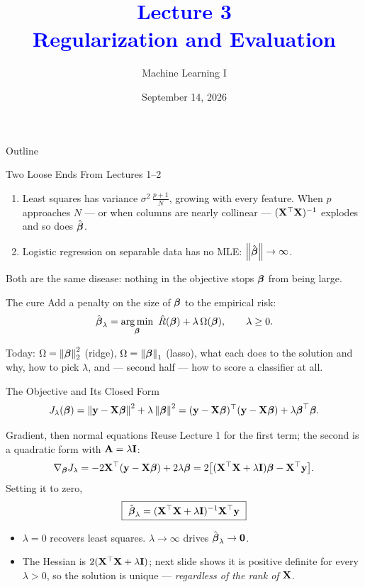\documentclass[11pt,aspectratio=169]{beamer}
\title{\textcolor{blue}{Lecture 3 \\ Regularization and Evaluation}}
\subtitle{Machine Learning I}
\date{September 14, 2026}
\begin{document}
\begin{frame}[plain]
\maketitle
\end{frame}

\begin{frame}{Outline}
\tableofcontents
\end{frame}

\begin{frame}{Two Loose Ends From Lectures 1--2}
\begin{enumerate}
  \item Least squares has variance $\sigma^2\,\tfrac{p+1}{N}$, growing with every feature. When $p$ approaches
        $N$ --- or when columns are nearly collinear --- $(\mathbf{X}^{\top}\mathbf{X})^{-1}$ explodes and so does $\hat{\boldsymbol{\beta}}$.
  \item Logistic regression on separable data has no MLE: $\left\lVert \hat{\boldsymbol{\beta}} \right\rVert\to\infty$.
\end{enumerate}
\vspace{4pt}
Both are the same disease: nothing in the objective stops $\boldsymbol{\beta}$ from being large.
\begin{block}{The cure}
Add a penalty on the size of $\boldsymbol{\beta}$ to the empirical risk:
\[
\hat{\boldsymbol{\beta}}_\lambda=\operatorname*{arg\,min}_{\boldsymbol{\beta}}\ \hat R(\boldsymbol{\beta})+\lambda\,\Omega(\boldsymbol{\beta}),\qquad\lambda\ge0 .
\]
\end{block}
Today: $\Omega=\left\lVert \boldsymbol{\beta} \right\rVert_2^2$ (ridge), $\Omega=\left\lVert \boldsymbol{\beta} \right\rVert_1$ (lasso), what each does to the solution and why,
how to pick $\lambda$, and --- second half --- how to score a classifier at all.
\end{frame}


\begin{frame}{The Objective and Its Closed Form}
\[
J_\lambda(\boldsymbol{\beta})=\left\lVert \mathbf{y}-\mathbf{X}\boldsymbol{\beta} \right\rVert^2+\lambda\left\lVert \boldsymbol{\beta} \right\rVert^2
=(\mathbf{y}-\mathbf{X}\boldsymbol{\beta})^{\top}(\mathbf{y}-\mathbf{X}\boldsymbol{\beta})+\lambda\boldsymbol{\beta}^{\top}\boldsymbol{\beta} .
\]
\begin{derivation}{Gradient, then normal equations}
Reuse Lecture 1 for the first term; the second is a quadratic form with $\mathbf{A}=\lambda\mathbf{I}$:
\[
\nabla_{\boldsymbol{\beta}}J_\lambda=-2\mathbf{X}^{\top}(\mathbf{y}-\mathbf{X}\boldsymbol{\beta})+2\lambda\boldsymbol{\beta}=2\bigl[(\mathbf{X}^{\top}\mathbf{X}+\lambda\mathbf{I})\boldsymbol{\beta}-\mathbf{X}^{\top}\mathbf{y}\bigr].
\]
Setting it to zero,
\[
\boxed{\ \hat\vbeta_\lambda=(\vX\T\vX+\lambda\vI)\inv\vX\T\vy\ }
\]
\end{derivation}
\begin{itemize}
  \item $\lambda=0$ recovers least squares. $\lambda\to\infty$ drives $\hat{\boldsymbol{\beta}}_\lambda\to\mathbf{0}$.
  \item The Hessian is $2(\mathbf{X}^{\top}\mathbf{X}+\lambda\mathbf{I})$; next slide shows it is positive definite for every $\lambda>0$,
        so the solution is unique --- \emph{regardless of the rank of }$\mathbf{X}$.
\end{itemize}
\end{frame}
\end{document}
